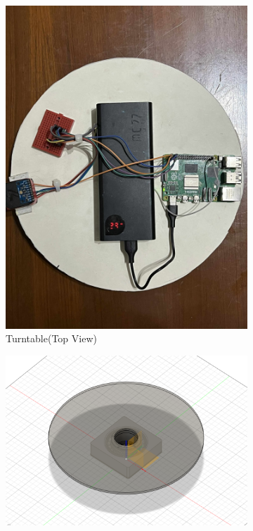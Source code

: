 \documentclass{iutbscthesis}
\begin{document}
\begin{figure}[h!]
    \centering
    \begin{subfigure}[b]{0.3\textwidth}
        \centering
        \includegraphics[width=\textwidth]{Turntable_top.jpg}
        \caption{Turntable(Top View)}
        \label{fig:real turntable}
    \end{subfigure}
    \hfill
    \begin{subfigure}[b]{0.3\textwidth}
        \centering
        \includegraphics[width=\textwidth]{Turntable_fusion.png}

\end{subfigure}
\end{figure}
\end{document}
